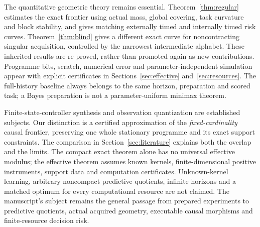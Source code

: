 The quantitative geometric theory remains essential. Theorem~\ref{thm:regular} estimates the exact frontier using actual mass, global covering, task curvature and block stability, and gives matching externally timed and internally timed risk curves. Theorem~\ref{thm:blind} gives a different exact curve for noncontracting singular acquisition, controlled by the narrowest intermediate alphabet. These inherited results are re-proved, rather than promoted again as new contributions. Programme bits, scratch, numerical error and parameter-independent simulation appear with explicit certificates in Sections~\ref{sec:effective} and~\ref{sec:resources}. The full-history baseline always belongs to the same horizon, preparation and scored task; a Bayes preparation is not a parameter-uniform minimax theorem.

Finite-state-controller synthesis and observation quantization are established subjects\cite{poupart,junges,continuous}. Our distinction is a certified approximation of the \emph{fixed-cardinality} causal frontier, preserving one whole stationary programme and its exact support constraints. The comparison in Section~\ref{sec:literature} explains both the overlap and the limits. The compact exact theorem alone has no universal effective modulus; the effective theorem assumes known kernels, finite-dimensional positive instruments, support data and computation certificates. Unknown-kernel learning, arbitrary noncompact predictive quotients, infinite horizons and a matched optimum for every computational resource are not claimed. The manuscript's subject remains the general passage from prepared experiments to predictive quotients, actual acquired geometry, executable causal morphisms and finite-resource decision risk.
